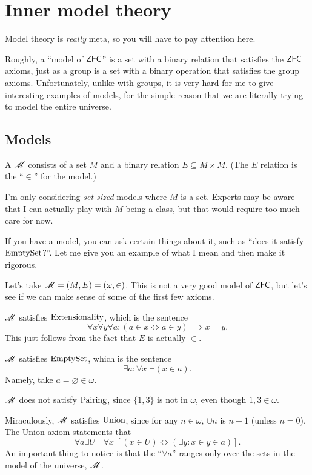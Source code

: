 \chapter{Inner model theory}
Model theory is \emph{really} meta, so you will have to pay attention here.

Roughly, a ``model of $\mathsf{ZFC}$'' is a set with a binary relation that satisfies the $\mathsf{ZFC}$ axioms,
just as a group is a set with a binary operation that satisfies the group axioms.
Unfortunately, unlike with groups, it is very hard for me to give interesting examples of models,
for the simple reason that we are literally trying to model the entire universe.

\section{Models}
\begin{definition}
	A  $\mathscr M$ consists of a set $M$ and a
	binary relation $E \subseteq M \times M$.
	(The $E$ relation is the ``$\in$'' for the model.)
\end{definition}
\begin{remark}
	I'm only considering \emph{set-sized} models where $M$ is a set.
	Experts may be aware that I can actually play with $M$ being a class,
	but that would require too much care for now.
\end{remark}
If you have a model, you can ask certain things about it,
such as ``does it satisfy $\mathrm{EmptySet}$?''.
Let me give you an example of what I mean and then make it rigorous.
\begin{example}
	Let's take $\mathscr M = (M,E) = \left( \omega, \in \right)$.
	This is not a very good model of $\mathsf{ZFC}$, but let's see if we can
	make sense of some of the first few axioms.
	\begin{enumerate}[(a)]
		\ii $\mathscr M$ satisfies $\mathrm{Extensionality}$, which is the sentence
		\[ \forall x \forall y \forall a :
			\left( a \in x \iff a \in y \right) \implies x = y. \]
		This just follows from the fact that $E$ is actually $\in$.

		\ii $\mathscr M$ satisfies $\mathrm{EmptySet}$, which is the sentence
		\[ \exists a : \forall x \; \neg (x \in a). \]
		Namely, take $a = \varnothing \in \omega$.

		\ii $\mathscr M$ does not satisfy $\mathrm{Pairing}$, since $\{1,3\}$ is not in $\omega$,
		even though $1, 3 \in \omega$.

		\ii Miraculously, $\mathscr M$ satisfies $\mathrm{Union}$, since for any $n \in \omega$,
		$\cup n$ is $n-1$ (unless $n=0$).
		The Union axiom statements that
		\[ \forall a \exists U \quad \forall x \;
		\left[ (x \in U) \iff (\exists y : x \in y \in a) \right]. \]
		An important thing to notice is that the ``$\forall a$'' ranges only over
		the sets in the model of the universe, $\mathscr M$.
	\end{enumerate}
\end{example}
